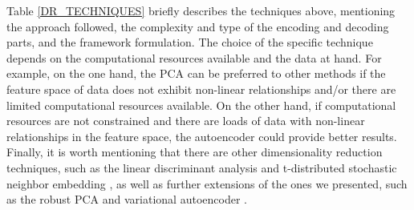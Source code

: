 Table \ref{DR_TECHNIQUES} briefly describes the techniques above, mentioning the approach followed, the complexity and type of the encoding and decoding parts, and the framework formulation. The choice of the specific technique depends on the computational resources available and the data at hand. For example, on the one hand, the PCA can be preferred to other methods if the feature space of data does not exhibit non-linear relationships and/or there are limited computational resources available. On the other hand, if computational resources are not constrained and there are loads of data with non-linear relationships in the feature space, the autoencoder could provide better results. Finally, it is worth mentioning that there are other dimensionality reduction techniques, such as the linear discriminant analysis \cite{tharwat2017lda} and t-distributed stochastic neighbor embedding \cite{belkina2019tsne}, as well as further extensions of the ones we presented, such as the robust PCA \cite{bouwmans2014rpca} and variational autoencoder \cite{kingma2014vae}.
